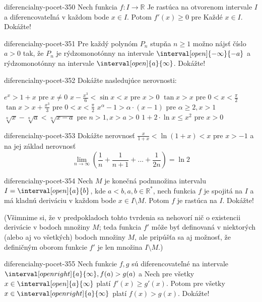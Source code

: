 \begin{defproblem}{diferencialny-pocet-350}
Nech funkcia $f: I \rightarrow\mathbb{R}$ Je rastúca na otvorenom intervale $I$
a diferencovateľná v každom bode $x\in I$. Potom $f'(x)\geq 0$ pre Každé $x\in
I$. Dokážte!
\end{defproblem}

\begin{defproblem}{diferencialny-pocet-351}
Pre každý polynóm $P_n$ stupňa $n\geq 1$ možno nájsť číslo $a>0$ tak, že $P_n$
je rýdzomonotónny na intervale $\interval[open]{-\infty}{-a}$ a rýdzomonotónny
na intervale $\interval[open]{a}{\infty}$. Dokážte!
\end{defproblem}

\begin{defproblem}{diferencialny-pocet-352}
Dokážte nasledujúce nerovnosti:
\begin{tasks}
\task $e^x>1+x$ pre $x\neq 0$
\task $x-\frac{x^3}{6}<\sin x<x$ pre $x>0$
\task $\tan x>x$ pre $0<x<\frac{\pi}{2}$
\task $\tan x>x+\frac{x^3}{3}$ pre $0<x<\frac{\pi}{2}$
\task $x^{\alpha}-1>\alpha\cdot(x-1)$ pre $\alpha\geq 2,x>1$
\task $\sqrt[n]{x}-\sqrt[n]{a}<\sqrt[n]{x-a}$ pre $n>1,x>a>0$
\task $1+2\cdot\ln x\leq x^2$ pre $x>0$
\end{tasks}
\end{defproblem}

\begin{defproblem}{diferencialny-pocet-353}
Dokážte nerovnosť $\frac{x}{1+x}<\ln (1+x)<x$ pre $x>-1$ a na jej základ
nerovnosť
\[
  \lim_{n \rightarrow \infty}(\frac{1}{n}+\frac{1}{n+1}+...+\frac{1}{2n})=\ln 2
\]
\end{defproblem}

\begin{defproblem}{diferencialny-pocet-354}
Nech $M$ je konečná podmnožina intervalu $I=\interval[open]{a}{b}$, kde $a<b, a,
b \in \mathbb{R^*}$, nech funkcia $f$ je spojitá na $I$ a má kladnú deriváciu v
každom bode $x\in I \setminus M$. Potom $f$ je rastúca na $I$. Dokážte!

(Všimnime si, že v predpokladoch tohto tvrdenia sa nehovorí nič o existencii
derivácie v bodoch množiny $M$; teda funkcia $f'$ môže byť definovaná v
niektorých (alebo aj vo všetkých) bodoch množiny $M$, ale pripúšťa sa aj
možnosť, že definičným oborom funkcie $f'$ je len množina $I \setminus M$.)
\end{defproblem}

\begin{defproblem}{diferencialny-pocet-355}
Nech funkcie $f,g$ sú diferencovateľné na intervale $\interval[open
right]{a}{\infty}, f(a)>g(a)$ a Nech pre všetky $x \in
\interval[open]{a}{\infty}$ platí $f'(x)\geq g'(x)$. Potom pre všetky $x\in
\interval[open right]{a}{\infty}$ platí $f(x)>g(x)$. Dokážte!
\end{defproblem}

